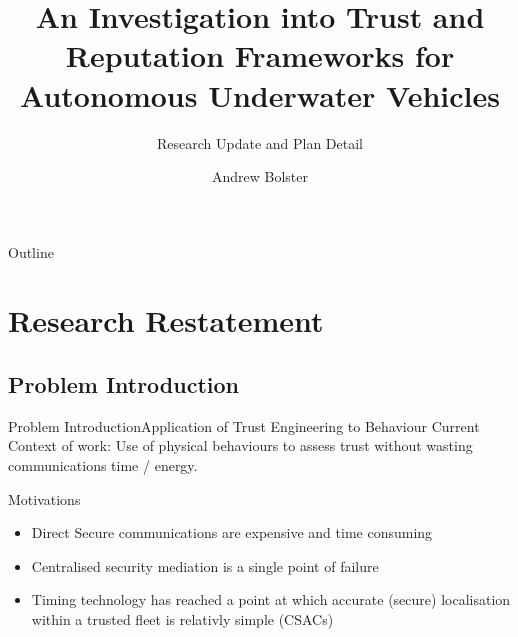 \documentclass[10pt]{beamer}
\title[DSTL Visit]{An Investigation into Trust and Reputation Frameworks for Autonomous Underwater Vehicles}
\subtitle
{Research Update and Plan Detail}
\author[Andrew Bolster] %
{Andrew Bolster}
\institute[ECIT] %
{
  \inst{1}%
  Institute of Electronics, Communication, and Information Technology\\
  Queen's University Belfast 
  }
\date[ECIT November '12]
\begin{document}
\begin{frame}
  \titlepage
\end{frame}

\begin{frame}{Outline}
  \tableofcontents
\end{frame}





\section{Research Restatement}

\subsection{Problem Introduction}

\begin{frame}{Problem Introduction}{Application of Trust Engineering to Behaviour}
  Current Context of work: Use of physical behaviours to assess trust without wasting communications time / energy.

  Motivations
  \begin{itemize}
    \item Direct Secure communications are expensive and time consuming
    \item Centralised security mediation is a single point of failure
    \item Timing technology has reached a point at which accurate (secure) localisation within a trusted fleet is relativly simple (CSACs)
  \end{itemize}
\end{frame}
\end{document}
